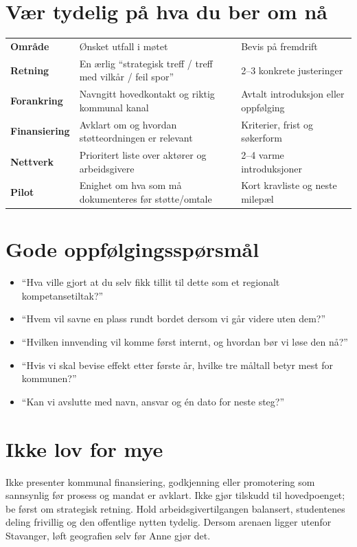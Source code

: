 \documentclass[10pt,a4paper]{article}
\begin{document}
\section{Vær tydelig på hva du ber om nå}

\begin{tabularx}{\linewidth}{>{\bfseries}p{35mm} X p{38mm}}
\rowcolor{ink}\color{white}Område & \color{white}Ønsket utfall i møtet & \color{white}Bevis på fremdrift\\
Retning & En ærlig ``strategisk treff / treff med vilkår / feil spor'' & 2--3 konkrete justeringer\\
Forankring & Navngitt hovedkontakt og riktig kommunal kanal & Avtalt introduksjon eller oppfølging\\
Finansiering & Avklart om og hvordan støtteordningen er relevant & Kriterier, frist og søkerform\\
Nettverk & Prioritert liste over aktører og arbeidsgivere & 2--4 varme introduksjoner\\
Pilot & Enighet om hva som må dokumenteres før støtte/omtale & Kort kravliste og neste milepæl\\
\end{tabularx}

\section{Gode oppfølgingsspørsmål}

\begin{itemize}
\item ``Hva ville gjort at du selv fikk tillit til dette som et regionalt kompetansetiltak?''
\item ``Hvem vil savne en plass rundt bordet dersom vi går videre uten dem?''
\item ``Hvilken innvending vil komme først internt, og hvordan bør vi løse den nå?''
\item ``Hvis vi skal bevise effekt etter første år, hvilke tre måltall betyr mest for kommunen?''
\item ``Kan vi avslutte med navn, ansvar og én dato for neste steg?''
\end{itemize}

\section{Ikke lov for mye}

Ikke presenter kommunal finansiering, godkjenning eller promotering som sannsynlig før prosess og mandat er avklart. Ikke gjør tilskudd til hovedpoenget; be først om strategisk retning. Hold arbeidsgivertilgangen balansert, studentenes deling frivillig og den offentlige nytten tydelig. Dersom arenaen ligger utenfor Stavanger, løft geografien selv før Anne gjør det.
\end{document}
